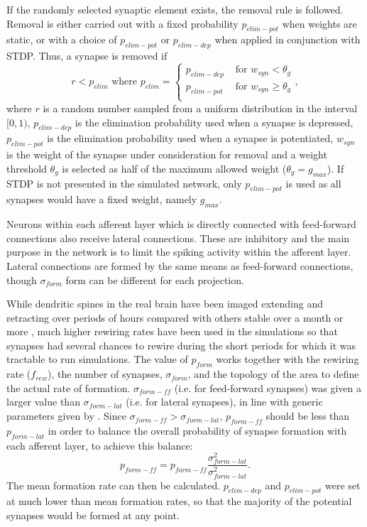 \documentclass[letterpaper, 10 pt, conference]{ieeeconf}  %
\begin{document}
If the randomly selected synaptic element exists, the removal rule is followed.
Removal is either carried out with a fixed probability $p_{elim-pot}$ when weights are static, or with a choice of $p_{elim-pot}$  or $p_{elim-dep}$ when applied in conjunction with STDP. Thus, a synapse is removed if
%
\begin{equation} \label{eq:elimination_rule}
r<p_{elim} \text{ where } p_{elim} = 
    \begin{cases}
        p_{elim-dep} & \text{ for }   w_{syn}  < \theta_g \\
        p_{elim-pot} & \text{ for }   w_{syn}  \geq \theta_g \\
    \end{cases},
\end{equation}
%
where $r$ is a random number sampled from a uniform distribution in the interval $[0, 1)$, $p_{elim-dep}$ is the elimination probability used when a synapse is depressed, $p_{elim-pot}$ is the elimination probability used when a synapse is potentiated, $w_{syn}$ is the weight of the synapse under consideration for removal and a weight threshold $\theta_g$ is selected as half of the maximum allowed weight ($ \theta_g = g_{max}$). 
If STDP is not presented in the simulated network, only $p_{elim-pot}$ is used as all synapses would have a fixed weight, namely $g_{max}$.

Neurons within each afferent layer which is directly connected with feed-forward connections also receive lateral connections. These are inhibitory and the main purpose in the network is to limit the spiking activity within the afferent layer. 
Lateral connections are formed by the same means as feed-forward connections, though $\sigma_{form}$ form can be different for each projection.

While dendritic spines in the real brain have been imaged extending and retracting over periods of hours compared with others stable over a month or more \cite{Grutzendler2002}, 
much higher rewiring rates have been used in the simulations so that synapses had several chances to rewire during the short periods for which it was tractable to run simulations.
The value of $p_{form}$ works together with the rewiring rate ($f_{rew}$), the number of synapses, $\sigma_{form}$, and the topology of the area to define the actual rate of formation.
$\sigma_{form-ff}$ (i.e. for feed-forward synapses) was given a larger value than $\sigma_{form-lat}$ (i.e. for lateral synapses), in line with generic parameters given by \cite{miikkulainen2006computational}.
Since $\sigma_{form-ff} > \sigma_{form-lat}$, $p_{form-ff}$ should be less than $p_{form-lat}$ in order to balance the overall probability of synapse formation with each afferent layer, to achieve this balance:
\begin{equation}
    p_{form-ff} = p_{form-ff} \frac{\sigma^2_{form-lat}}{\sigma^2_{form-lat}}.
\end{equation}
The mean formation rate can then be calculated. 
$p_{elim-dep}$ and $p_{elim-pot}$ were set at much lower than mean formation rates, so that the majority of the potential synapses would be formed at any point.
\end{document}

